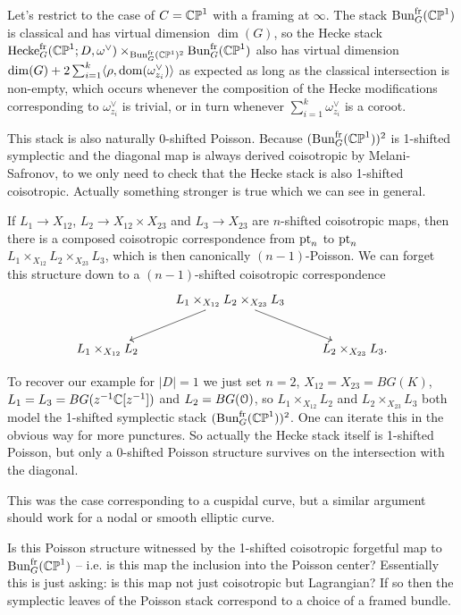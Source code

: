 \documentclass[10pt, oneside]{article}
\newcommand{\hecke}{\mathrm{Hecke}}
\begin{document}
\begin{example}
Let's restrict to the case of $C = \mathbb{CP}^1$ with a framing at $\infty$.  The stack $\operatorname{Bun}_G^{\mathrm{fr}}(\mathbb{CP}^1)$ is classical and has virtual dimension $\dim(G)$, so the Hecke stack $\hecke^{\mr{fr}}_G(\bb{CP}^1;D,\omega^\vee) \times_{\bun^{\mr{fr}}_G(\bb{CP}^1)^2} \bun^{\mr{fr}}_G(\bb{CP}^1)$ also has virtual dimension $\dim(G) + 2\sum_{i=1}^k \langle \rho, \mathrm{dom}(\omega^\vee_{z_i})\rangle$ as expected as long as the classical intersection is non-empty, which occurs whenever the composition of the Hecke modifications corresponding to $\omega^\vee_{z_i}$ is trivial, or in turn whenever $\sum_{i=1}^k \omega^\vee_{z_i}$ is a coroot.

This stack is also naturally 0-shifted Poisson.  Because $(\operatorname{Bun}_G^{\mathrm{fr}}(\mathbb{CP}^1))^2$ is 1-shifted symplectic and the diagonal map is always derived coisotropic by Melani-Safronov, to we only need to check that the Hecke stack is also 1-shifted coisotropic.  Actually something stronger is true which we can see in general.  

\begin{claim}
If $L_1 \to X_{12}$, $L_2 \to X_{12} \times X_{23}$ and $L_3 \to X_{23}$ are $n$-shifted coisotropic maps, then there is a composed coisotropic correspondence from $\operatorname{pt}_n$ to $\operatorname{pt}_n$ $L_1 \times_{X_{12}} L_2 \times_{X_{23}} L_3$, which is then canonically $(n-1)$-Poisson.  We can forget this structure down to a $(n-1)$-shifted coisotropic correspondence 
\[\xymatrix{
 &L_1 \times_{X_{12}} L_2 \times_{X_{23}} L_3 \ar[dl] \ar[dr] \\
 L_1 \times_{X_{12}} L_2 &&L_2 \times_{X_{23}} L_3.
}\]
\end{claim}
To recover our example for $|D|=1$ we just set $n=2$, $X_{12} = X_{23} = BG(K)$, $L_1 = L_3 = BG(z^{-1}\mathbb{C}[z^{-1}])$ and $L_2 = BG(\mathcal{O})$, so $L_1 \times_{X_{12}} L_2$ and $L_2 \times_{X_{23}} L_3$ both model the 1-shifted symplectic stack $(\operatorname{Bun}_G^{\mathrm{fr}}(\mathbb{CP}^1))^2$.  One can iterate this in the obvious way for more punctures.  So actually the Hecke stack itself is 1-shifted Poisson, but only a 0-shifted Poisson structure survives on the intersection with the diagonal.  

This was the case corresponding to a cuspidal curve, but a similar argument should work for a nodal or smooth elliptic curve.
\end{example}

\begin{question}
Is this Poisson structure witnessed by the 1-shifted coisotropic forgetful map to $\operatorname{Bun}_G^{\mathrm{fr}}(\mathbb{CP}^1)$ -- i.e. is this map the inclusion into the Poisson center?  Essentially this is just asking: is this map not just coisotropic but Lagrangian?  If so then the symplectic leaves of the Poisson stack correspond to a choice of a framed bundle.
\end{question}
\end{document}
